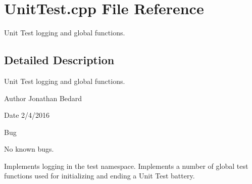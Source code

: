 \section{Unit\+Test.\+cpp File Reference}
\label{UnitTest_8cpp}


Unit Test logging and global functions.  




\subsection{Detailed Description}
Unit Test logging and global functions. 

\begin{DoxyAuthor}{Author}
Jonathan Bedard 
\end{DoxyAuthor}
\begin{DoxyDate}{Date}
2/4/2016 
\end{DoxyDate}
\begin{DoxyRefDesc}{Bug}
\item[{\bf Bug}]No known bugs.\end{DoxyRefDesc}


Implements logging in the test namespace. Implements a number of global test functions used for initializing and ending a Unit Test battery. 